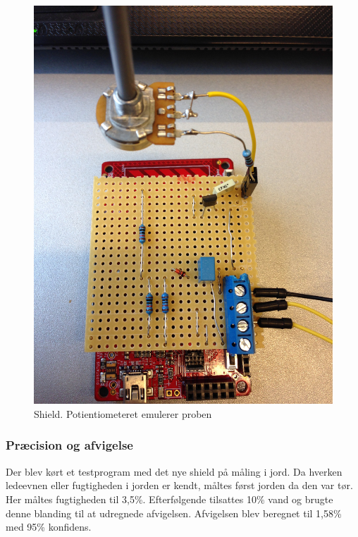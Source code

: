 \begin{figure}[H]
	\centering 
\includegraphics[scale=0.08]{HardwareArkitektur/Sensore/Jordfugt_billeder/shield.JPG}
	\caption{Shield. Potientiometeret emulerer proben}
	\label{photo:shield}
\end{figure} 

\subsubsection{Præcision og afvigelse}
Der blev kørt et testprogram med det nye shield på måling i jord. Da hverken ledeevnen eller fugtigheden i jorden er kendt, måltes først jorden da den var tør. Her måltes fugtigheden til 3,5\%. Efterfølgende tilsattes 10\% vand og brugte denne blanding til at udregnede afvigelsen. Afvigelsen blev beregnet til 1,58\% med 95\% konfidens. 

